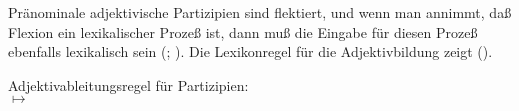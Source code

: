 {Pränominale adjektivische Partizipien sind flektiert, und
wenn man annimmt, daß Flexion ein lexikalischer Prozeß ist, dann muß die Eingabe
für diesen Prozeß ebenfalls lexikalisch sein (\citealp[]{Dowty78a};
\citealp[]{Bresnan82a}).
%
Die Lexikonregel für die Adjektivbildung zeigt ().

\eas
\label{lr-adjective-formation-da-approach}
Adjektivableitungsregel für Partizipien:\\
%
%
 $\mapsto$\\
\zs

}
